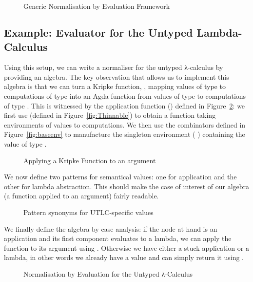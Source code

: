 \begin{figure}[h]
\caption{Generic Normalisation by Evaluation Framework\label{defn:NbE}}
\end{figure}

\subsection{Example: Evaluator for the Untyped Lambda-Calculus}

Using this setup, we can write a normaliser for the untyped λ-calculus
by providing an algebra. The key observation that allows us to implement
this algebra is that we can turn a Kripke function, , mapping values
of type  to computations of type  into an Agda function from
values of type  to computations of type . This is witnessed
by the application function (\AF{\_\$\$\_}) defined in Figure~\ref{fig:kripkeapp}:
we first use  (defined in Figure~\ref{fig:Thinnable}) to obtain
a function taking environments of values to computations. We then use the
combinators defined in Figure~\ref{fig:baseenv} to manufacture the singleton
environment {(  )} containing the value  of type
.

\begin{figure}[h]
\caption{Applying a Kripke Function to an argument}\label{fig:kripkeapp}
\end{figure}

We now define two patterns for semantical values: one for application and
the other for lambda abstraction. This should make the case of interest of
our algebra (a function applied to an argument) fairly readable.

\begin{figure}[h]
\caption{Pattern synonyms for UTLC-specific  values}
\end{figure}

We finally define the algebra by case analysis: if the node at hand is an
application and its first component evaluates to a lambda, we can apply
the function to its argument using \AF{\_\$\$\_}. Otherwise we have either a
stuck application or a lambda, in other words we already have a value and can
simply return it using .

\begin{figure}[h]
\caption{Normalisation by Evaluation for the Untyped λ-Calculus}
\end{figure}


